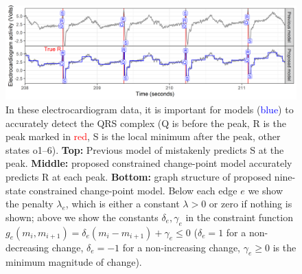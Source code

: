 \documentclass[12pt]{article}
\begin{document}
\begin{figure}[h]
    \centering
    \includegraphics[width=\textwidth]{figure-one-ecg-graph-data}
    
    
    \vskip -0.5cm
    \caption{In these electrocardiogram data, it is important for
      models (\textcolor{blue}{blue}) to accurately detect the QRS
      complex (Q is before the peak, R is the peak marked in
      \textcolor{red}{red}, S is the local minimum after the peak,
      other states o1--6). \textbf{Top:} Previous model of
      \citet{PanTompkins1985} mistakenly predicts S at the
      peak. \textbf{Middle:} proposed constrained change-point model
      accurately predicts R at each peak.  \textbf{Bottom:} graph
      structure of proposed nine-state constrained change-point model.
      Below each edge $e$ we show the penalty $\lambda_e$, which is
      either a constant $\lambda>0$ or zero if nothing is shown; above
      we show the constants $\delta_e,\gamma_e$ in the constraint
      function
      $g_e(m_i,m_{i+1})= \delta_e(m_i - m_{i+1})+\gamma_e\leq 0$
      ($\delta_e=1$ for a non-decreasing change, $\delta_e=-1$ for a
      non-increasing change, $\gamma_e \geq 0$ is the minimum
      magnitude of change).
  }
\end{figure}



\end{document}
